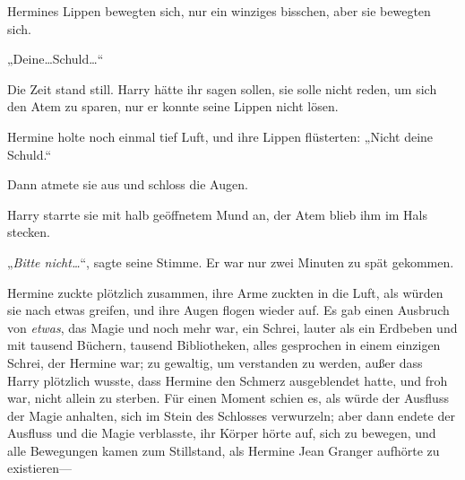 Hermines Lippen bewegten sich, nur ein winziges bisschen, aber sie bewegten sich.

„Deine…Schuld…“

Die Zeit stand still. Harry hätte ihr sagen sollen, sie solle nicht reden, um sich den Atem zu sparen, nur er konnte seine Lippen nicht lösen.

Hermine holte noch einmal tief Luft, und ihre Lippen flüsterten: „Nicht deine Schuld.“

Dann atmete sie aus und schloss die Augen.

Harry starrte sie mit halb geöffnetem Mund an, der Atem blieb ihm im Hals stecken.

„\emph{Bitte nicht…}“, sagte seine Stimme. Er war nur zwei Minuten zu spät gekommen.

Hermine zuckte plötzlich zusammen, ihre Arme zuckten in die Luft, als würden sie nach etwas greifen, und ihre Augen flogen wieder auf. Es gab einen Ausbruch von \emph{etwas}, das Magie und noch mehr war, ein Schrei, lauter als ein Erdbeben und mit tausend Büchern, tausend Bibliotheken, alles gesprochen in einem einzigen Schrei, der Hermine war; zu gewaltig, um verstanden zu werden, außer dass Harry plötzlich wusste, dass Hermine den Schmerz ausgeblendet hatte, und froh war, nicht allein zu sterben. Für einen Moment schien es, als würde der Ausfluss der Magie anhalten, sich im Stein des Schlosses verwurzeln; aber dann endete der Ausfluss und die Magie verblasste, ihr Körper hörte auf, sich zu bewegen, und alle Bewegungen kamen zum Stillstand, als Hermine Jean Granger aufhörte zu existieren—

